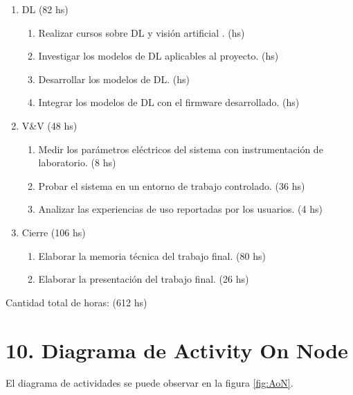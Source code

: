 \documentclass[
11pt, %
]{plan}
\begin{document}
\begin{enumerate}
\item DL (82 hs)
	\begin{enumerate}
		\item Realizar cursos sobre DL y visión artificial
. (hs)
		\item Investigar los modelos de DL aplicables al proyecto. (hs)
		\item Desarrollar los modelos de DL. (hs)
		\item Integrar los modelos de DL con el firmware desarrollado. (hs)
	\end{enumerate}

\item V\&V (48 hs)
	\begin{enumerate}
		\item Medir los parámetros eléctricos del sistema con instrumentación de laboratorio. (8 hs)
		\item Probar el sistema en un entorno de trabajo controlado. (36 hs)
		\item Analizar las experiencias de uso reportadas por los usuarios. (4 hs)
	\end{enumerate}
	
\item Cierre (106 hs)
	\begin{enumerate}
		\item Elaborar la memoria técnica del trabajo final. (80 hs)
		\item Elaborar la presentación del trabajo final. (26 hs)
	\end{enumerate}
\end{enumerate}

Cantidad total de horas: (612 hs)

\section{10. Diagrama de Activity On Node}
\label{sec:AoN}

El diagrama de actividades se puede observar en la figura \ref{fig:AoN}.
\end{document}
